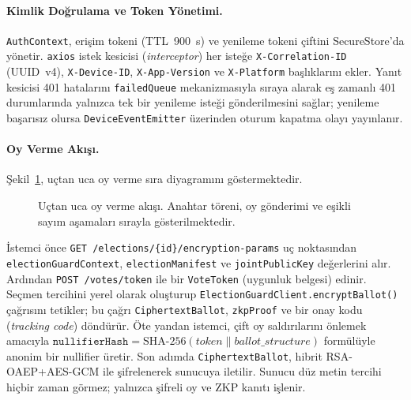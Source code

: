 \documentclass[a4paper,fleqn]{cas-sc}
\begin{document}
\paragraph{Kimlik Doğrulama ve Token Yönetimi.}
\texttt{AuthContext}, erişim tokeni (TTL~900~s) ve yenileme tokeni
çiftini SecureStore'da yönetir.
\texttt{axios} istek kesicisi (\textit{interceptor}) her isteğe
\texttt{X-Correlation-ID} (UUID~v4), \texttt{X-Device-ID},
\texttt{X-App-Version} ve \texttt{X-Platform} başlıklarını ekler.
Yanıt kesicisi 401 hatalarını \texttt{failedQueue} mekanizmasıyla
sıraya alarak eş zamanlı 401 durumlarında yalnızca tek bir yenileme
isteği gönderilmesini sağlar; yenileme başarısız olursa
\texttt{DeviceEventEmitter} üzerinden oturum kapatma olayı yayınlanır.

\paragraph{Oy Verme Akışı.}
Şekil~\ref{fig:voting_flow}, uçtan uca oy verme sıra diyagramını
göstermektedir.

\begin{figure}[ht]
  \centering
  \fbox{\rule{0pt}{9cm}\rule{0.95\linewidth}{0pt}}
  \caption{Uçtan uca oy verme akışı. Anahtar töreni, oy gönderimi ve
           eşikli sayım aşamaları sırayla gösterilmektedir.}
  \label{fig:voting_flow}
\end{figure}

İstemci önce \texttt{GET /elections/\{id\}/encryption-params} uç
noktasından \texttt{electionGuardContext}, \texttt{electionManifest} ve
\texttt{jointPublicKey} değerlerini alır.
Ardından \texttt{POST /votes/token} ile bir \texttt{VoteToken} (uygunluk
belgesi) edinir.
Seçmen tercihini yerel olarak oluşturup \texttt{ElectionGuardClient\-.en\-crypt\-Ballot()} çağrısını tetikler;
bu çağrı \texttt{CiphertextBallot}, \texttt{zkpProof} ve bir onay kodu
(\textit{tracking code}) döndürür.
Öte yandan istemci, çift oy saldırılarını önlemek amacıyla
$\texttt{nullifierHash} = \text{SHA-256}(\mathit{token} \mathbin{\|}
\mathit{ballot\_structure})$
formülüyle anonim bir nullifier üretir.
Son adımda \texttt{CiphertextBallot}, hibrit RSA-OAEP+AES-GCM ile
şifrelenerek sunucuya iletilir.
Sunucu düz metin tercihi hiçbir zaman görmez; yalnızca şifreli oy ve ZKP
kanıtı işlenir.
\end{document}

